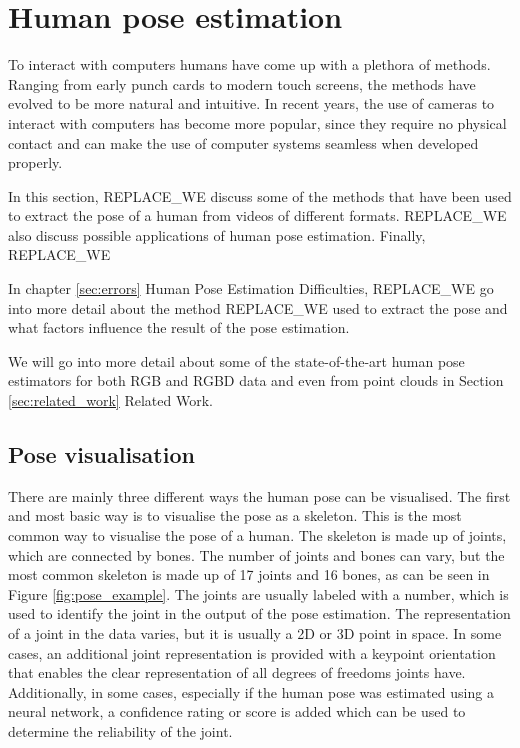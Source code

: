 \section{Human pose estimation}

To interact with computers humans have come up with a plethora of methods. Ranging from early punch cards to modern touch screens, the methods have evolved to be more natural and intuitive. In recent years, the use of cameras to interact with computers has become more popular, since they require no physical contact and can make the use of computer systems seamless when developed properly.

In this section, REPLACE_WE discuss some of the methods that have been used to extract the pose of a human from videos of different formats. REPLACE_WE also discuss possible applications of human pose estimation. Finally, REPLACE_WE 

In chapter \ref{sec:errors} Human Pose Estimation Difficulties, REPLACE_WE go into more detail about the method REPLACE_WE used to extract the pose and what factors influence the result of the pose estimation.

We will go into more detail about some of the state-of-the-art human pose estimators for both RGB and RGBD data and even from point clouds in Section \ref{sec:related_work} Related Work.

\subsection{Pose visualisation}

There are mainly three different ways the human pose can be visualised. The first and most basic way is to visualise the pose as a skeleton. This is the most common way to visualise the pose of a human. The skeleton is made up of joints, which are connected by bones. The number of joints and bones can vary, but the most common skeleton is made up of 17 joints and 16 bones, as can be seen in Figure \ref{fig:pose_example}. The joints are usually labeled with a number, which is used to identify the joint in the output of the pose estimation. The representation of a joint in the data varies, but it is usually a 2D or 3D point in space. In some cases, an additional joint representation is provided with a keypoint orientation that enables the clear representation of all degrees of freedoms joints have\cite{KeypointOrientation}. Additionally, in some cases, especially if the human pose was estimated using a neural network, a confidence rating or score is added which can be used to determine the reliability of the joint.

